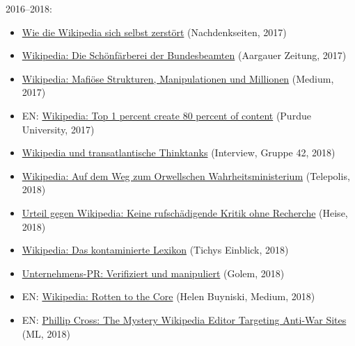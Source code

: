2016--2018:

\begin{itemize}
\tightlist
\item
  \href{https://www.nachdenkseiten.de/?p=37340}{Wie die Wikipedia sich
  selbst zerstört} (Nachdenkseiten, 2017)
\item
  \href{https://www.aargauerzeitung.ch/schweiz/wikipedia-umschreiben-loeschen-manipulieren-die-schoenfaerberei-der-bundesbeamten-130051388}{Wikipedia:
  Die Schönfärberei der Bundesbeamten} (Aargauer Zeitung, 2017)
\item
  \href{https://medium.com/@Klarsager/wikipedia-mafi\%C3\%B6se-strukturen-manipulationen-und-millionenverm\%C3\%B6gen-59f7e2086915}{Wikipedia:
  Mafiöse Strukturen, Manipulationen und Millionen} (Medium, 2017)
\item
  EN:
  \href{https://www.purdue.edu/newsroom/releases/2017/Q4/results-of-wikipedia-study-may-surprise.html}{Wikipedia:
  Top 1 percent create 80 percent of content} (Purdue University, 2017)
\item
  \href{https://www.youtube.com/watch?v=lRrZrJZYXJc}{Wikipedia und
  transatlantische Thinktanks} (Interview, Gruppe 42, 2018)
\item
  \href{https://www.heise.de/tp/features/Wikipedia-auf-dem-Weg-zum-Orwellschen-Wahrheitsministerium-4059211.html?seite=all}{Wikipedia:
  Auf dem Weg zum Orwellschen Wahrheitsministerium} (Telepolis, 2018)
\item
  \href{https://www.heise.de/newsticker/meldung/Urteil-gegen-Wikipedia-Keine-rufschaedigende-Kritik-ohne-Recherche-4209610.html}{Urteil
  gegen Wikipedia: Keine rufschädigende Kritik ohne Recherche} (Heise,
  2018)
\item
  \href{https://www.tichyseinblick.de/feuilleton/medien/enttarnung-eines-wiederholungstaeters-wikipedia-das-kontaminierte-lexikon/}{Wikipedia:
  Das kontaminierte Lexikon} (Tichys Einblick, 2018)
\item
  \href{https://www.golem.de/news/wikipedia-autoren-verifiziert-und-manipuliert-1812-137610.html}{Unternehmens-PR:
  Verifiziert und manipuliert} (Golem, 2018)
\item
  EN:
  \href{https://web.archive.org/web/20181201154510/https://medium.com/@helen.buyniski/wikipedia-rotten-to-the-core-dcc435781c45}{Wikipedia:
  Rotten to the Core} (Helen Buyniski, Medium, 2018)
\item
  EN:
  \href{https://www.mintpressnews.com/phillip-cross-the-mystery-wikipedia-editor-targeting-anti-war-sites/250824/}{Phillip
  Cross: The Mystery Wikipedia Editor Targeting Anti-War Sites} (ML,
  2018)
\end{itemize}

